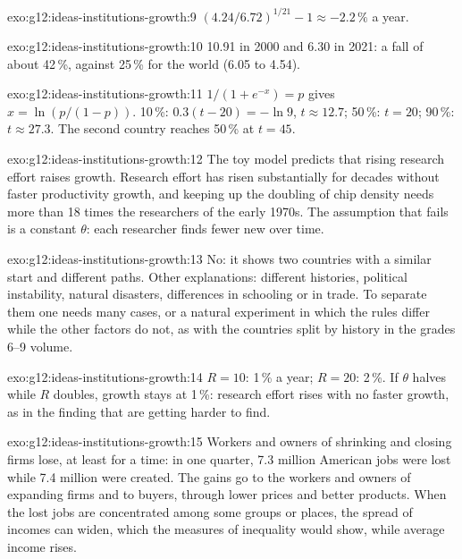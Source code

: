 \begin{solution}{exo:g12:ideas-institutions-growth:9}
$(4.24/6.72)^{1/21} - 1 \approx -2.2\,\%$ a year.
\end{solution}

\begin{solution}{exo:g12:ideas-institutions-growth:10}
10.91 in 2000 and 6.30 in 2021: a fall of about 42\,\%, against 25\,\% for the world (6.05 to 4.54).
\end{solution}

\begin{solution}{exo:g12:ideas-institutions-growth:11}
$1/(1 + e^{-x}) = p$ gives $x = \ln(p/(1 - p))$. 10\,\%: $0.3(t - 20) = -\ln 9$, $t \approx 12.7$; 50\,\%: $t = 20$; 90\,\%: $t \approx 27.3$. The second country reaches 50\,\% at
$t = 45$.
\end{solution}

\begin{solution}{exo:g12:ideas-institutions-growth:12}
The toy model predicts that rising research effort raises growth. Research effort has risen substantially for decades without faster productivity growth, and keeping up
the doubling of chip density needs more than 18 times the researchers of the early 1970s. The assumption that fails is a constant $\theta$: each researcher finds fewer
new  over time.
\end{solution}

\begin{solution}{exo:g12:ideas-institutions-growth:13}
No: it shows two countries with a similar start and different paths. Other explanations: different histories, political
instability, natural disasters, differences in schooling or in trade. To separate them one needs many cases, or a natural experiment in which the rules differ while the
other factors do not, as with the countries split by history in the grades 6--9 volume.
\end{solution}

\begin{solution}{exo:g12:ideas-institutions-growth:14}
$R = 10$: 1\,\% a year; $R = 20$: 2\,\%. If $\theta$ halves while $R$ doubles, growth stays at 1\,\%: research effort rises with no faster growth, as in the finding that 
are getting harder to find.
\end{solution}

\begin{solution}{exo:g12:ideas-institutions-growth:15}
Workers and owners of shrinking and closing firms lose, at least for a time: in one quarter, 7.3 million American jobs were lost while 7.4 million were created. The gains go
to the workers and owners of expanding firms and to buyers, through lower prices and better products. When the lost jobs are concentrated among some groups or places,
the spread of incomes can widen, which the measures of inequality would show, while average income rises.
\end{solution}

